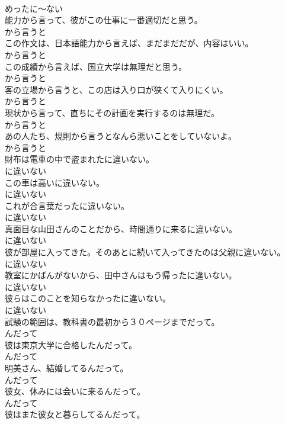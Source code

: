 \documentclass[8pt]{extreport}
\begin{document}
\begin{CJK}{UTF8}{min}
\\	めったに～ない	
\\	能力から言って、彼がこの仕事に一番適切だと思う。	
\\	から言うと	
\\	この作文は、日本語能力から言えば、まだまだだが、内容はいい。	
\\	から言うと	
\\	この成績から言えば、国立大学は無理だと思う。	
\\	から言うと	
\\	客の立場から言うと、この店は入り口が狭くて入りにくい。	
\\	から言うと	
\\	現状から言って、直ちにその計画を実行するのは無理だ。	
\\	から言うと	
\\	あの人たち、規則から言うとなんら悪いことをしていないよ。	
\\	から言うと	
\\	財布は電車の中で盗まれたに違いない。	
\\	に違いない	
\\	この車は高いに違いない。	
\\	に違いない	
\\	これが合言葉だったに違いない。	
\\	に違いない	
\\	真面目な山田さんのことだから、時間通りに来るに違いない。	
\\	に違いない	
\\	彼が部屋に入ってきた。そのあとに続いて入ってきたのは父親に違いない。	
\\	に違いない	
\\	教室にかばんがないから、田中さんはもう帰ったに違いない。	
\\	に違いない	
\\	彼らはこのことを知らなかったに違いない。	
\\	に違いない	
\\	試験の範囲は、教科書の最初から３０ページまでだって。	
\\	んだって	
\\	彼は東京大学に合格したんだって。	
\\	んだって	
\\	明美さん、結婚してるんだって。	
\\	んだって	
\\	彼女、休みには会いに来るんだって。	
\\	んだって	
\\	彼はまた彼女と暮らしてるんだって。	

\end{CJK}
\end{document}
